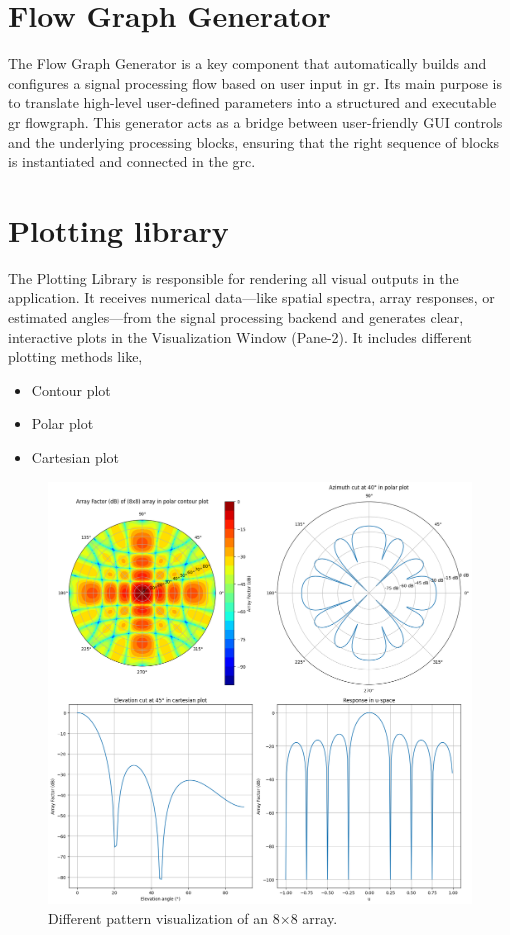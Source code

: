 \section{Flow Graph Generator}

The Flow Graph Generator is a key component that automatically builds and configures a signal processing flow based on user input in \acl{gr}. Its main purpose is to translate high-level user-defined parameters into a structured and executable \ac{gr} flowgraph. This generator acts as a bridge between user-friendly GUI controls and the underlying processing blocks, ensuring that the right sequence of blocks is instantiated and connected in the \acf{grc}.

\section{Plotting library}

The Plotting Library is responsible for rendering all visual outputs in the application. It receives numerical data—like spatial spectra, array responses, or estimated angles—from the signal processing backend and generates clear, interactive plots in the Visualization Window (Pane-2). It includes different plotting methods like,

\begin{itemize}
	\item Contour plot
	\item Polar plot
	\item Cartesian plot
\end{itemize}

\clearpage
\begin{figure}[H]
	\centering
	\hspace*{-1.8cm}
	\includegraphics[scale=0.56]{images//plots}
	\caption{Different pattern visualization of an 8$\times$8 array.}
\end{figure}